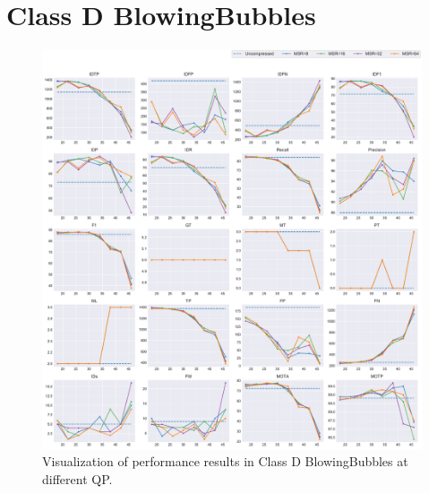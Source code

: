 
\section{Class D BlowingBubbles}
\label{sec:appendix/BlowingBubbles_all}


\begin{figure}[!htbp]
\centering
\includegraphics[width=1.0\linewidth]{img/appendix/BlowingBubbles_all_multiplots_qp.pdf}
\caption[Visualization of performance results in Class D BlowingBubbles at different QP]
{Visualization of performance results in Class D BlowingBubbles at different QP.}
\label{fig:BlowingBubbles_all_qp}
\end{figure}


